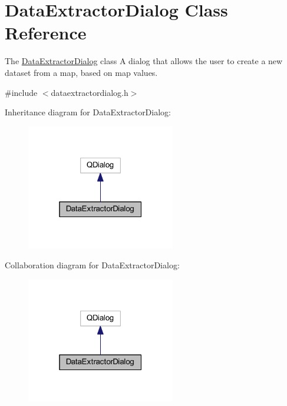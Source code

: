 \hypertarget{class_data_extractor_dialog}{\section{Data\+Extractor\+Dialog Class Reference}
\label{class_data_extractor_dialog}
}


The \hyperlink{class_data_extractor_dialog}{Data\+Extractor\+Dialog} class A dialog that allows the user to create a new dataset from a map, based on map values.  




{\ttfamily \#include $<$dataextractordialog.\+h$>$}



Inheritance diagram for Data\+Extractor\+Dialog\+:\nopagebreak
\begin{figure}[H]
\begin{center}
\leavevmode
\includegraphics[width=184pt]{class_data_extractor_dialog__inherit__graph}
\end{center}
\end{figure}


Collaboration diagram for Data\+Extractor\+Dialog\+:\nopagebreak
\begin{figure}[H]
\begin{center}
\leavevmode
\includegraphics[width=184pt]{class_data_extractor_dialog__coll__graph}
\end{center}
\end{figure}
